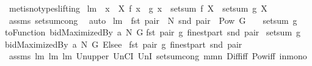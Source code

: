 \begin{isabellebody}
\ {\isacharparenleft}metis{\isacharparenleft}no{\isacharunderscore}types{\isacharcomma}lifting{\isacharparenright}{\isacharparenright}%
\endisatagproof
{\isafoldproof}%
%
\isadelimproof
\isanewline
%
\endisadelimproof
\isanewline
\isanewline
\isanewline
\isanewline
{}\isamarkupfalse%
\ lm{}{}{\isacharcolon}\ \ {\isachardoublequoteopen}{\isasymforall}x\ {\isasymin}\ X{\isachardot}\ f\ x\ {\isacharequal}\ g\ x{\isachardoublequoteclose}\ \ {\isachardoublequoteopen}setsum\ f\ X\ {\isacharequal}\ setsum\ g\ X{\isachardoublequoteclose}\ \isanewline
%
\isadelimproof
%
\endisadelimproof
%
\isatagproof
{}\isamarkupfalse%
\ assms\ setsum{\isachardot}cong\ \isamarkupfalse%
\ auto%
\endisatagproof
{\isafoldproof}%
%
\isadelimproof
\isanewline
%
\endisadelimproof
\isanewline
{}\isamarkupfalse%
\ lm{}{}{\isacharcolon}\ \ {\isachardoublequoteopen}fst\ pair\ {\isasymin}\ N{\isachardoublequoteclose}\ {\isachardoublequoteopen}snd\ pair\ {\isasymin}\ Pow\ G\ {\isacharminus}\ {\isacharbraceleft}{\isacharbraceleft}{\isacharbraceright}{\isacharbraceright}{\isachardoublequoteclose}\ \ {\isachardoublequoteopen}setsum\ {\isacharparenleft}{\isacharpercent}g{\isachardot}\isanewline
{\isacharparenleft}toFunction\ {\isacharparenleft}bidMaximizedBy\ a\ N\ G{\isacharparenright}{\isacharparenright}\isanewline
{\isacharparenleft}fst\ pair{\isacharcomma}\ g{\isacharparenright}{\isacharparenright}\ {\isacharparenleft}finestpart\ {\isacharparenleft}snd\ pair{\isacharparenright}{\isacharparenright}\ {\isacharequal}\isanewline
setsum\ {\isacharparenleft}{\isacharpercent}g{\isachardot}\ \isanewline
{\isacharparenleft}{\isacharparenleft}bidMaximizedBy\ a\ N\ G{\isacharparenright}\ Elsee\ {}{\isacharparenright}\isanewline
{\isacharparenleft}fst\ pair{\isacharcomma}\ g{\isacharparenright}{\isacharparenright}\ {\isacharparenleft}finestpart\ {\isacharparenleft}snd\ pair{\isacharparenright}{\isacharparenright}{\isachardoublequoteclose}\isanewline
%
\isadelimproof
%
\endisadelimproof
%
\isatagproof
{}\isamarkupfalse%
\ assms\ lm{}{}\ lm{}{}\ lm{}{}\ Un{\isacharunderscore}upper{}\ UnCI\ UnI{}\ setsum{\isachardot}cong\ mm{}{}n\ Diff{\isacharunderscore}iff\ Pow{\isacharunderscore}iff\ in{\isacharunderscore}mono\isanewline
{}\isamarkupfalse%
\ {\isacharminus}\isanewline

\end{isabellebody}
